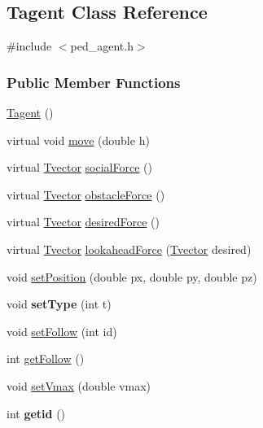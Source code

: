 \hypertarget{classTagent}{
\subsection{Tagent Class Reference}
\label{classTagent}
}


{\ttfamily \#include $<$ped\_\-agent.h$>$}

\subsubsection*{Public Member Functions}
\begin{DoxyCompactItemize}
\item 
\hyperlink{classTagent_aa6dd5a70a8d0b1935cbbbf03570be054}{Tagent} ()
\item 
virtual void \hyperlink{classTagent_a28fa59a3b56ab4257086d95c538316e9}{move} (double h)
\item 
virtual \hyperlink{classTvector}{Tvector} \hyperlink{classTagent_a7d0b940a371329b51e7864e9dee460b5}{socialForce} ()
\item 
virtual \hyperlink{classTvector}{Tvector} \hyperlink{classTagent_af6d483df56bd9e208a3a070f0a690151}{obstacleForce} ()
\item 
virtual \hyperlink{classTvector}{Tvector} \hyperlink{classTagent_aa74d94d0d8c9054dae3316ac12c4ed8e}{desiredForce} ()
\item 
virtual \hyperlink{classTvector}{Tvector} \hyperlink{classTagent_ad85f5af13f909f90c49952fa053180e0}{lookaheadForce} (\hyperlink{classTvector}{Tvector} desired)
\item 
void \hyperlink{classTagent_a5e6afaa247611931e81289bb4145972c}{setPosition} (double px, double py, double pz)
\item 
\hypertarget{classTagent_a1988ca8e14a0331bc910514b5a28503a}{
void {\bfseries setType} (int t)}
\label{classTagent_a1988ca8e14a0331bc910514b5a28503a}

\item 
void \hyperlink{classTagent_aa87476255c97102d37ac24da4ec72bf1}{setFollow} (int id)
\item 
int \hyperlink{classTagent_a036e9c5f7fd6e77cd6e701fd7844496b}{getFollow} ()
\item 
void \hyperlink{classTagent_aafdb71b4e2eee551cd6c9bf8887d588c}{setVmax} (double vmax)
\item 
\hypertarget{classTagent_a19e09efc516a01cd286e3aedbc4293a6}{
int {\bfseries getid} ()}
\label{classTagent_a19e09efc516a01cd286e3aedbc4293a6}


\end{DoxyCompactItemize}
